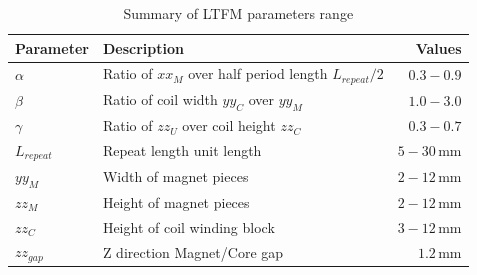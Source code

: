             
            \begin{table}[h]
                \renewcommand{\arraystretch}{1.2}
                \caption{Summary of \acs{LTFM} parameters range}
                \label{table:chap/rsm/LTFM/design range}
                \centering
                \begin{tabular}{@{}llr@{}}
                \hline
                \bfseries Parameter & \bfseries Description & \bfseries Values\\
                \hline
                    $\alpha$	    & Ratio of $xx_M$ over half period length $L_{repeat}/2$  &	$0.3-0.9$\\ 
                    $\beta$	        & Ratio of coil width $yy_C$ over $yy_M$	&	$1.0-3.0$\\ 
                    $\gamma$	    & Ratio of $zz_U$ over coil height	$zz_C$	&	$0.3-0.7$\\ 
                    $L_{repeat}$    & Repeat length unit length                 &   $5-30\,\mathrm{mm}$\\
                    $yy_M$	        & Width of magnet pieces 	                &	$2-12\,\mathrm{mm}$\\ 
                    $zz_M$	        & Height of magnet pieces			        &	$2-12\,\mathrm{mm}$\\ 
                    $zz_C$	        & Height of coil winding block 			    &	$3-12\,\mathrm{mm}$\\ 
                    $zz_{gap}$      & Z direction Magnet/Core gap               &	$1.2\,\mathrm{mm}$\\ 
                \hline
                \end{tabular}
            \end{table}
            
